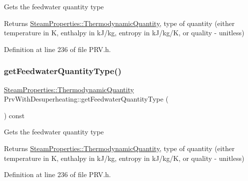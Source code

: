 Gets the feedwater quantity type

\begin{DoxyReturn}{Returns}
\hyperlink{class_steam_properties_ae0294bedf7d178c2d8fb6aed0f62fbff}{Steam\+Properties\+::\+Thermodynamic\+Quantity}, type of quantity (either temperature in K, enthalpy in k\+J/kg, entropy in k\+J/kg/K, or quality -\/ unitless) 
\end{DoxyReturn}


Definition at line 236 of file P\+R\+V.\+h.

\mbox{\label{class_prv_with_desuperheating_aa6901e00ecf819d95f79c20ef1775876}} 
\subsubsection{\texorpdfstring{get\+Feedwater\+Quantity\+Type()}{getFeedwaterQuantityType()}\hspace{0.1cm}{\footnotesize\ttfamily [2/3]}}
{\footnotesize\ttfamily \hyperlink{class_steam_properties_ae0294bedf7d178c2d8fb6aed0f62fbff}{Steam\+Properties\+::\+Thermodynamic\+Quantity} Prv\+With\+Desuperheating\+::get\+Feedwater\+Quantity\+Type (\begin{DoxyParamCaption}{ }\end{DoxyParamCaption}) const\hspace{0.3cm}{\ttfamily [inline]}}

Gets the feedwater quantity type

\begin{DoxyReturn}{Returns}
\hyperlink{class_steam_properties_ae0294bedf7d178c2d8fb6aed0f62fbff}{Steam\+Properties\+::\+Thermodynamic\+Quantity}, type of quantity (either temperature in K, enthalpy in k\+J/kg, entropy in k\+J/kg/K, or quality -\/ unitless) 
\end{DoxyReturn}


Definition at line 236 of file P\+R\+V.\+h.

\mbox{\label{class_prv_with_desuperheating_aa6901e00ecf819d95f79c20ef1775876}} 
